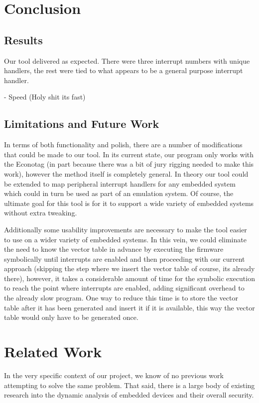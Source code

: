 \documentclass[letterpaper, 10 pt, conference]{ieeeconf}
\begin{document}
\section{Conclusion}
\subsection{Results}
Our tool delivered as expected. There were three interrupt numbers with unique handlers, the rest were tied to what appears to be a general purpose interrupt handler. %

- Speed (Holy shit its fast)

\subsection{Limitations and Future Work}%
In terms of both functionality and polish, there are a number of modifications that could be made to our tool. In its current state, our program only works with the Econotag (in part because there was a bit of jury rigging needed to make this work), however the method itself is completely general. In theory our tool could be extended to map peripheral interrupt handlers for any embedded system which could in turn be used as part of an emulation system. Of course, the ultimate goal for this tool is for it to support a wide variety of embedded systems without extra tweaking. 

Additionally some usability improvements are necessary to make the tool easier to use on a wider variety of embedded systems. In this vein, we could eliminate the need to know the vector table in advance by executing the firmware symbolically until interrupts are enabled and then proceeding with our current approach (skipping the step where we insert the vector table of course, its already there), however, it takes a considerable amount of time for the symbolic execution to reach the point where interrupts are enabled, adding significant overhead to the already slow program. One way to reduce this time is to store the vector table after it has been generated and insert it if it is available, this way the vector table would only have to be generated once.



\section{Related Work} %
In the very specific context of our project, we know of no previous work attempting to solve the same problem. That said, there is a large body of existing research into the dynamic analysis of embedded devices and their overall security.
\end{document}
